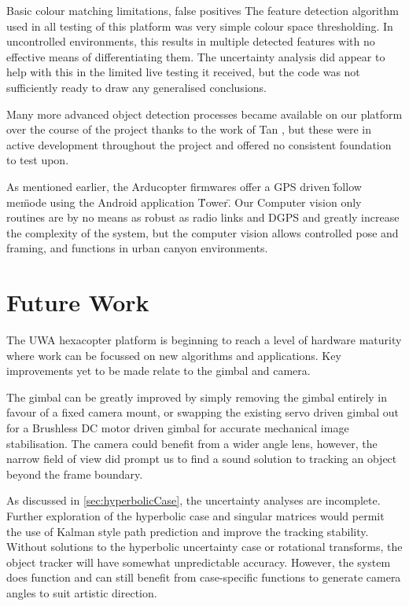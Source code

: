 \documentclass[a4paper, 11pt, titlepage]{article}
\begin{document}
    Basic colour matching limitations, false positives
    The feature detection algorithm used in all testing of this platform was very simple colour space thresholding.  In uncontrolled environments, this results in multiple detected features with no effective means of differentiating them.  The uncertainty analysis did appear to help with this in the limited live testing it received, but the code was not sufficiently ready to draw any generalised conclusions.

    Many more advanced object detection processes became available on our platform over the course of the project thanks to the work of Tan \cite{Tan}, but these were in active development throughout the project and offered no consistent foundation to test upon.

    As mentioned earlier, the Arducopter firmwares offer a GPS driven \"follow me\" mode using the Android application \"Tower\".  
    Our Computer vision only routines are by no means as robust as radio links and DGPS and greatly increase the complexity of the system, but the computer vision allows controlled pose and framing, and functions in urban canyon environments.

\section{Future Work}

  The UWA hexacopter platform is beginning to reach a level of hardware maturity where work can be focussed on new algorithms and applications.  Key improvements yet to be made relate to the gimbal and camera.

  The gimbal can be greatly improved by simply removing the gimbal entirely in favour of a fixed camera mount, or swapping the existing servo driven gimbal out for a Brushless DC motor driven gimbal for accurate mechanical image stabilisation.  The camera could benefit from a wider angle lens, however, the narrow field of view did prompt us to find a sound solution to tracking an object beyond the frame boundary.

  As discussed in \ref{sec:hyperbolicCase}, the uncertainty analyses are incomplete.  Further exploration of the hyperbolic case and singular matrices would permit the use of Kalman style path prediction and improve the tracking stability.
  Without solutions to the hyperbolic uncertainty case or rotational transforms, the object tracker will have somewhat unpredictable accuracy.  However, the system does function and can still benefit from case-specific functions to generate camera angles to suit artistic direction.
\end{document}
